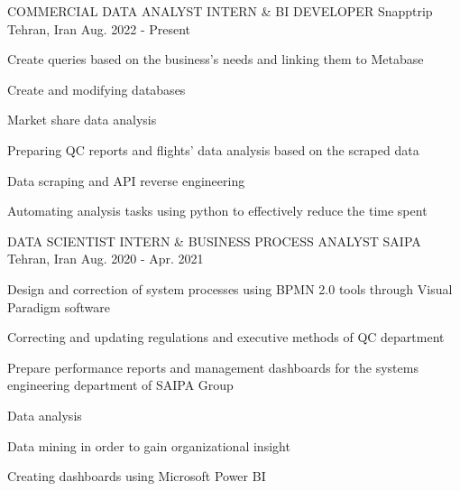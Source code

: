 

\begin{cventries}

  \cventry
    {COMMERCIAL DATA ANALYST INTERN \& BI DEVELOPER} %
    {Snapptrip} %
    {Tehran, Iran} %
    {Aug. 2022 - Present} %
    {
      \begin{cvitems} %
        \item {Create queries based on the business's needs and linking them to Metabase}
        \item {Create and modifying databases}
        \item {Market share data analysis}
        \item {Preparing QC reports and flights' data analysis based on the scraped data}
        \item {Data scraping and API reverse engineering}
        \item {Automating analysis tasks using python to effectively reduce the time spent}
      \end{cvitems}
    }

  \cventry
    {DATA SCIENTIST INTERN \& BUSINESS PROCESS ANALYST} %
    {SAIPA} %
    {Tehran, Iran} %
    {Aug. 2020 - Apr. 2021} %
    {
      \begin{cvitems} %
        \item {Design and correction of system processes using BPMN 2.0 tools through Visual Paradigm software}
        \item {Correcting and updating regulations and executive methods of QC department}
        \item {Prepare performance reports and management dashboards for the systems engineering department of SAIPA Group}
        \item {Data analysis}
        \item {Data mining in order to gain organizational insight}
        \item {Creating dashboards using Microsoft Power BI}
      \end{cvitems}
    }

\end{cventries}
